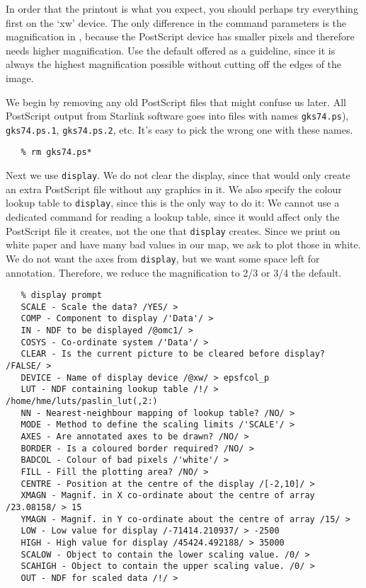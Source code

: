    In order that the printout is what you expect, you should perhaps try
   everything first on the `xw' device. The only difference in the
   command parameters is the magnification in
{\tt {}},
   because
   the PostScript device has smaller pixels and therefore needs higher
   magnification. Use the default offered as a guideline, since it is
   always the highest magnification possible without cutting off the
   edges of the image.

   We begin by removing any old PostScript files that might confuse us
   later. All PostScript output from Starlink software goes into files
   with names {\tt gks74.ps}), {\tt gks74.ps.1}, {\tt gks74.ps.2},
   etc. It's easy to pick the wrong one with these names.

\begin{verbatim}
   % rm gks74.ps*
\end{verbatim}

   Next we use {\tt display}. We do not clear the display, since that
   would only create an extra PostScript file without any graphics in
   it. We also specify the colour lookup table to {\tt display},
   since this is the only way to do it: We cannot use a dedicated
   command for reading a lookup table, since it would affect only the
   PostScript file it creates,
   not the one that {\tt display} creates. Since we print on white
   paper and have many bad values in our map, we ask to plot those in
   white. We do not want the axes from {\tt display}, but we want
   some space left for annotation. Therefore, we reduce the
   magnification to 2/3 or 3/4 the default.

\begin{verbatim}
   % display prompt
   SCALE - Scale the data? /YES/ >
   COMP - Component to display /'Data'/ >
   IN - NDF to be displayed /@omc1/ >
   COSYS - Co-ordinate system /'Data'/ >
   CLEAR - Is the current picture to be cleared before display? /FALSE/ >
   DEVICE - Name of display device /@xw/ > epsfcol_p
   LUT - NDF containing lookup table /!/ > /home/hme/luts/paslin_lut(,2:)
   NN - Nearest-neighbour mapping of lookup table? /NO/ >
   MODE - Method to define the scaling limits /'SCALE'/ >
   AXES - Are annotated axes to be drawn? /NO/ >
   BORDER - Is a coloured border required? /NO/ >
   BADCOL - Colour of bad pixels /'white'/ >
   FILL - Fill the plotting area? /NO/ >
   CENTRE - Position at the centre of the display /[-2,10]/ >
   XMAGN - Magnif. in X co-ordinate about the centre of array /23.08158/ > 15
   YMAGN - Magnif. in Y co-ordinate about the centre of array /15/ >
   LOW - Low value for display /-71414.210937/ > -2500
   HIGH - High value for display /45424.492188/ > 35000
   SCALOW - Object to contain the lower scaling value. /0/ >
   SCAHIGH - Object to contain the upper scaling value. /0/ >
   OUT - NDF for scaled data /!/ >
\end{verbatim}

